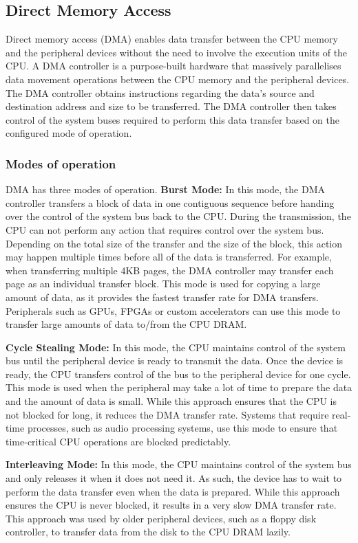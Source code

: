 \subsection{Direct Memory Access}
\label{subsec:interconnect-sc-background-dma}

Direct memory access (DMA) enables data transfer between the CPU memory and the peripheral devices without the need to involve the execution units of the CPU.
A DMA controller is a purpose-built hardware that massively parallelises data movement operations between the CPU memory and the peripheral devices.
The DMA controller obtains instructions regarding the data's source and destination address and size to be transferred.
The DMA controller then takes control of the system buses required to perform this data transfer based on the configured mode of operation.

\subsubsection{Modes of operation}
DMA has three modes of operation.
\textbf{Burst Mode:} In this mode, the DMA controller transfers a block of data in one contiguous sequence before handing over the control of the system bus back to the CPU.
During the transmission, the CPU can not perform any action that requires control over the system bus.
Depending on the total size of the transfer and the size of the block, this action may happen multiple times before all of the data is transferred.
For example, when transferring multiple 4KB pages, the DMA controller may transfer each page as an individual transfer block.
This mode is used for copying a large amount of data, as it provides the fastest transfer rate for DMA transfers.
Peripherals such as GPUs, FPGAs or custom accelerators can use this mode to transfer large amounts of data to/from the CPU DRAM.

\textbf{Cycle Stealing Mode:} In this mode, the CPU maintains control of the system bus until the peripheral device is ready to transmit the data.
Once the device is ready, the CPU transfers control of the bus to the peripheral device for one cycle.
This mode is used when the peripheral may take a lot of time to prepare the data and the amount of data is small.
While this approach ensures that the CPU is not blocked for long, it reduces the DMA transfer rate.
Systems that require real-time processes, such as audio processing systems, use this mode to ensure that time-critical CPU operations are blocked predictably.

\textbf{Interleaving Mode:} In this mode, the CPU maintains control of the system bus and only releases it when it does not need it.
As such, the device has to wait to perform the data transfer even when the data is prepared.
While this approach ensures the CPU is never blocked, it results in a very slow DMA transfer rate.
This approach was used by older peripheral devices, such as a floppy disk controller, to transfer data from the disk to the CPU DRAM lazily.